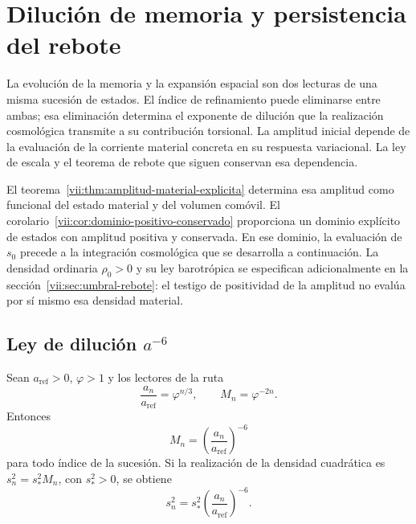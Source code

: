 
\section{Dilución de memoria y persistencia del rebote}
\label{vii:sec:dilucion-rebote}

La evolución de la memoria y la expansión espacial son dos lecturas de
una misma sucesión de estados. El índice de refinamiento puede eliminarse
entre ambas; esa eliminación determina el exponente de dilución que la
realización cosmológica transmite a su contribución torsional.
La amplitud inicial depende de la evaluación de la corriente material
concreta en su respuesta variacional. La ley de escala y el teorema
de rebote que siguen conservan esa dependencia.

El teorema~\ref{vii:thm:amplitud-material-explicita} determina esa
amplitud como funcional del estado material y del volumen comóvil.
El corolario~\ref{vii:cor:dominio-positivo-conservado} proporciona
un dominio explícito de estados con amplitud positiva y conservada.
En ese dominio, la evaluación de \(s_0\) precede a la integración
cosmológica que se desarrolla a continuación. La densidad ordinaria
\(\rho_0>0\) y su ley barotrópica se especifican adicionalmente en la
sección~\ref{vii:sec:umbral-rebote}: el testigo de positividad de la
amplitud no evalúa por sí mismo esa densidad material.

\subsection{Ley de dilución \texorpdfstring{\(a^{-6}\)}{a elevado a -6}}
\label{vii:sec:dilucion}

\begin{proposition}
\label{vii:prop:dilucion}
Sean \(a_{\mathrm{ref}}>0\), \(\varphi>1\) y los lectores de la ruta
\[
 \frac{a_n}{a_{\mathrm{ref}}}=\varphi^{n/3},\qquad
 M_n=\varphi^{-2n}.
\]
Entonces
\[
 M_n=\left(\frac{a_n}{a_{\mathrm{ref}}}\right)^{-6}
\]
para todo índice de la sucesión. Si la realización de la densidad
cuadrática es \(s_n^2=s_*^2M_n\), con \(s_*^2>0\), se obtiene
\[
 s_n^2=s_*^2\left(\frac{a_n}{a_{\mathrm{ref}}}\right)^{-6}.
\]
\end{proposition}

